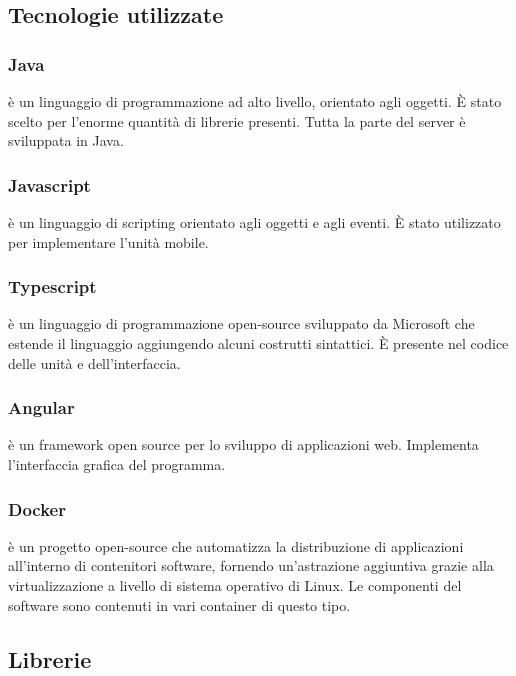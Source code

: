 \subsection{Tecnologie utilizzate}

	\subsubsection{Java}
	 è un linguaggio di programmazione ad alto livello, orientato agli oggetti. È stato scelto per l'enorme quantità di librerie presenti. Tutta la parte del server è sviluppata in Java.
	
	\subsubsection{Javascript}
	 è un linguaggio di scripting orientato agli oggetti e agli eventi. È stato utilizzato per implementare l'unità mobile.
	
	\subsubsection{Typescript}
	 è un linguaggio di programmazione open-source sviluppato da Microsoft che estende il linguaggio  aggiungendo alcuni costrutti sintattici. È presente nel codice delle unità e dell'interfaccia.
	
	\subsubsection{Angular}
	 è un framework open source per lo sviluppo di applicazioni web. Implementa l'interfaccia grafica del programma.
	
	\subsubsection{Docker}
	 è un progetto open-source che automatizza la distribuzione di applicazioni all’interno di contenitori software, fornendo un’astrazione aggiuntiva grazie alla virtualizzazione a livello di sistema operativo di Linux. Le componenti del software sono contenuti in vari container di questo tipo.

\subsection{Librerie}

